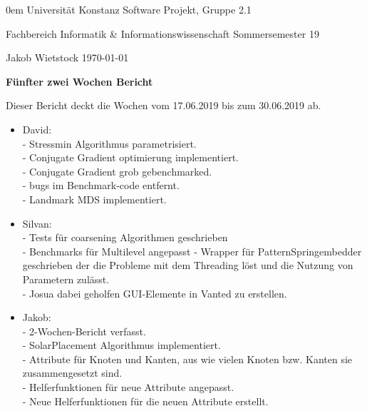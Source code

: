 \documentclass[]{article}
\date{}
\begin{document}
	
	{\footnotesize \parindent0em
		{\sc Universität Konstanz} \hfill {\sc Software Projekt, Gruppe 2.1}\par
		{\sc Fachbereich Informatik \& Informationswissenschaft} \hfill Sommersemester 19 \par
		Jakob Wietstock \hfill \today\par
		\bigskip
		\begin{center}
			{\LARGE\bf Fünfter zwei Wochen Bericht}
			\bigskip
		\end{center}
	}
	
	Dieser Bericht deckt die Wochen vom 17.06.2019 bis zum 30.06.2019 ab. \\
	
	\begin{itemize}
				
		\item  David: \\

		- Stressmin Algorithmus parametrisiert.\\
		- Conjugate Gradient optimierung implementiert.\\
		- Conjugate Gradient grob gebenchmarked.\\
		- bugs im Benchmark-code entfernt.\\
		- Landmark MDS implementiert.\\
				
		\item Silvan: \\
	- Tests für coarsening Algorithmen geschrieben\\
	- Benchmarks für Multilevel angepasst
	- Wrapper für PatternSpringembedder geschrieben der die Probleme mit dem Threading löst und die Nutzung von Parametern zulässt.\\
	- Josua dabei geholfen GUI-Elemente in Vanted zu erstellen. \\
		\item Jakob: \\

	- 2-Wochen-Bericht verfasst.\\
	- SolarPlacement Algorithmus implementiert.\\
	- Attribute für Knoten und Kanten, aus wie vielen Knoten bzw. Kanten sie zusammengesetzt sind.\\
	- Helferfunktionen für neue Attribute angepasst.\\
	- Neue Helferfunktionen für die neuen Attribute erstellt.\\
		

\end{itemize}
\end{document}
